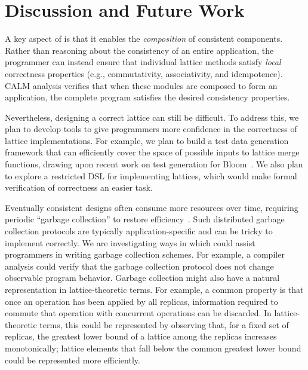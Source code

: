 \section{Discussion and Future Work}
\label{sec:discussion}
A key aspect of \lang is that it enables the \emph{composition} of consistent
components. Rather than reasoning about the consistency of an entire
application, the programmer can instead ensure that individual lattice methods
satisfy \emph{local} correctness properties (e.g., commutativity, associativity,
and idempotence). CALM analysis verifies that when these modules are composed to
form an application, the complete program satisfies the desired consistency
properties.

Nevertheless, designing a correct lattice can still be difficult. To address
this, we plan to develop tools to give programmers more confidence in the
correctness of lattice implementations. For example, we plan to build a test
data generation framework that can efficiently cover the space of possible
inputs to lattice merge functions, drawing upon recent work on test generation
for Bloom~\cite{Alvaro2012}. We also plan to explore a restricted DSL for
implementing lattices, which would make formal verification of correctness an
easier task.

Eventually consistent designs often consume more resources over time, requiring
periodic ``garbage collection'' to restore efficiency~\cite{Shapiro2011a}. Such
distributed garbage collection protocols are typically application-specific and
can be tricky to implement correctly. We are investigating ways in which \lang
could assist programmers in writing garbage collection schemes. For example, a
compiler analysis could verify that the garbage collection protocol does not
change observable program behavior. Garbage collection might also have a natural
representation in lattice-theoretic terms. For example, a common property is
that once an operation has been applied by all replicas, information required to
commute that operation with concurrent operations can be discarded. In
lattice-theoretic terms, this could be represented by observing that, for a
fixed set of replicas, the greatest lower bound of a lattice among the replicas
increases monotonically; lattice elements that fall below the common greatest
lower bound could be represented more efficiently.

